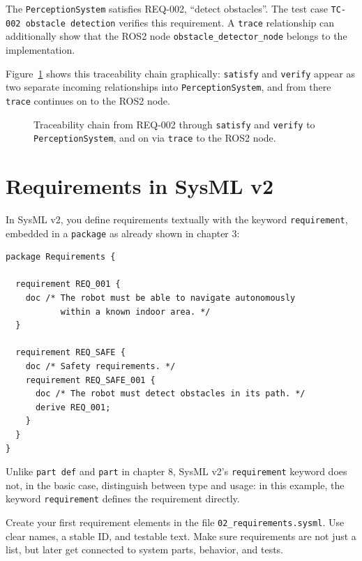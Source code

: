 \begin{praxisbox}
The \texttt{PerceptionSystem} satisfies REQ-002, \enquote{detect obstacles}. The test case \texttt{TC-002 obstacle detection} verifies this requirement. A \texttt{trace} relationship can additionally show that the ROS2 node \texttt{obstacle\_detector\_node} belongs to the implementation.
\end{praxisbox}

Figure~\ref{fig:kap06-traceability-req002} shows this traceability chain graphically: \texttt{satisfy} and \texttt{verify} appear as two separate incoming relationships into \texttt{PerceptionSystem}, and from there \texttt{trace} continues on to the ROS2 node.

\begin{figure}[H]
  \centering
  \caption{Traceability chain from REQ-002 through \texttt{satisfy} and \texttt{verify} to \texttt{PerceptionSystem}, and on via \texttt{trace} to the ROS2 node.}
  \label{fig:kap06-traceability-req002}
\end{figure}

\section{Requirements in SysML v2}
In SysML v2, you define requirements textually with the keyword \texttt{requirement}, embedded in a \texttt{package} as already shown in chapter 3:

\begin{lstlisting}
package Requirements {

  requirement REQ_001 {
    doc /* The robot must be able to navigate autonomously
           within a known indoor area. */
  }

  requirement REQ_SAFE {
    doc /* Safety requirements. */
    requirement REQ_SAFE_001 {
      doc /* The robot must detect obstacles in its path. */
      derive REQ_001;
    }
  }
}
\end{lstlisting}

Unlike \texttt{part def} and \texttt{part} in chapter 8, SysML v2's \texttt{requirement} keyword does not, in the basic case, distinguish between type and usage: in this example, the keyword \texttt{requirement} defines the requirement directly.

Create your first requirement elements in the file \texttt{02\_requirements.sysml}. Use clear names, a stable ID, and testable text. Make sure requirements are not just a list, but later get connected to system parts, behavior, and tests.

